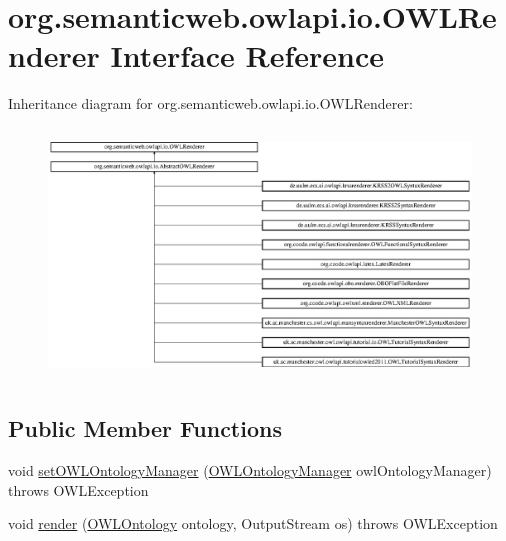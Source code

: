\hypertarget{interfaceorg_1_1semanticweb_1_1owlapi_1_1io_1_1_o_w_l_renderer}{\section{org.\-semanticweb.\-owlapi.\-io.\-O\-W\-L\-Renderer Interface Reference}
\label{interfaceorg_1_1semanticweb_1_1owlapi_1_1io_1_1_o_w_l_renderer}
}
Inheritance diagram for org.\-semanticweb.\-owlapi.\-io.\-O\-W\-L\-Renderer\-:\begin{figure}[H]
\begin{center}
\leavevmode
\includegraphics[height=6.679921cm]{interfaceorg_1_1semanticweb_1_1owlapi_1_1io_1_1_o_w_l_renderer}
\end{center}
\end{figure}
\subsection*{Public Member Functions}
\begin{DoxyCompactItemize}
\item 
void \hyperlink{interfaceorg_1_1semanticweb_1_1owlapi_1_1io_1_1_o_w_l_renderer_ab5374ee2c05ca35bbe5bba335fd5912f}{set\-O\-W\-L\-Ontology\-Manager} (\hyperlink{interfaceorg_1_1semanticweb_1_1owlapi_1_1model_1_1_o_w_l_ontology_manager}{O\-W\-L\-Ontology\-Manager} owl\-Ontology\-Manager)  throws O\-W\-L\-Exception
\item 
void \hyperlink{interfaceorg_1_1semanticweb_1_1owlapi_1_1io_1_1_o_w_l_renderer_ae997693c289e5bbe08605c48946bc012}{render} (\hyperlink{interfaceorg_1_1semanticweb_1_1owlapi_1_1model_1_1_o_w_l_ontology}{O\-W\-L\-Ontology} ontology, Output\-Stream os)  throws O\-W\-L\-Exception
\end{DoxyCompactItemize}


